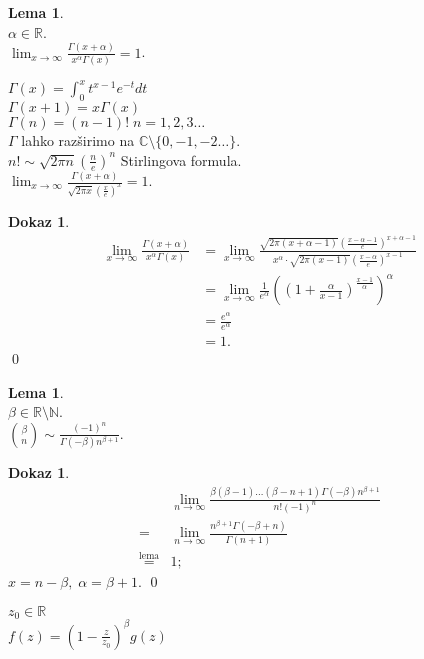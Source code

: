 \documentclass[a4paper, 12pt]{book}
\theoremstyle{definition}
\newtheorem{lemma}[counter]{Lema}
\newtheorem{pro}[counter]{Dokaz}
\theoremstyle{remark}
\newcommand{\N}{\mathbb{N}}
\newcommand{\R}{\mathbb{R}}
\newcommand{\C}{\mathbb{C}}
\begin{document}
\begin{lemma} \text{} \\
  $\alpha \in \R$. \\
  $\lim_{x \to \infty} \frac{\Gamma(x + \alpha)}{x^{\alpha} \Gamma(x)} = 1$.
\end{lemma}
$\Gamma(x) = \int_{0}^{x} t^{x-1} e^{-t} dt$ \\
$\Gamma(x+1) = x \Gamma(x)$ \\
$\Gamma(n) = (n-1)! \; n = 1, 2, 3 \dots$ \\
$\Gamma$ lahko razširimo na $\C \setminus \{0, -1, -2 \dots\}$. \\
$n! \sim \sqrt{2 \pi n} \left(\frac{n}{e}\right)^n$ Stirlingova formula. \\
$\lim_{x \to \infty} \frac{\Gamma(x + \alpha)}{\sqrt{2 \pi x} \left(\frac{x}{e}\right)^x} = 1$.
\begin{pro}
  \begin{align*}
    \lim_{x \to \infty} \frac{\Gamma(x + \alpha)}{x^{\alpha} \Gamma(x)}
    &= \lim_{x \to \infty} \frac
      {\sqrt{2 \pi (x+\alpha-1)} \left(\frac{x-\alpha-1}{e}\right)^{x+\alpha-1}}
      {x^{\alpha} \cdot \sqrt{2 \pi (x-1)} \left(\frac{x-\alpha}{e}\right)^{x-1}} \\
    &= \lim_{x \to \infty} \frac{1}{e^{\alpha}}
      \left(\left(1 + \frac{\alpha}{x-1}\right)^{\frac{x-1}{\alpha}}\right)^{\alpha} \\
    &= \frac{e^{\alpha}}{e^{\alpha}} \\
    &= 1.
  \end{align*}
  \qed
\end{pro}
\begin{lemma} \text{} \\
  $\beta \in \R \setminus \N$. \\
  $\binom{\beta}{n} \sim \frac{(-1)^n}{\Gamma(-\beta) n^{\beta+1}}$.
\end{lemma}
\begin{pro}
  \begin{align*}
    &\lim_{n \to \infty} \frac{\beta (\beta-1) \dots (\beta-n+1) \Gamma(-\beta) n^{\beta+1}}{n! (-1)^n} \\
    =& \lim_{n \to \infty} \frac{n^{\beta+1} \Gamma(-\beta+n)}{\Gamma(n+1)} \\
    \stackrel{\text{lema}}{=}& 1;
  \end{align*}
  $x = n - \beta, \; \alpha = \beta + 1$.
  \qed
\end{pro}
$z_0 \in \R$ \\
$f(z) = \left(1 - \frac{z}{z_0}\right)^{\beta} g(z)$ \\
\end{document}

